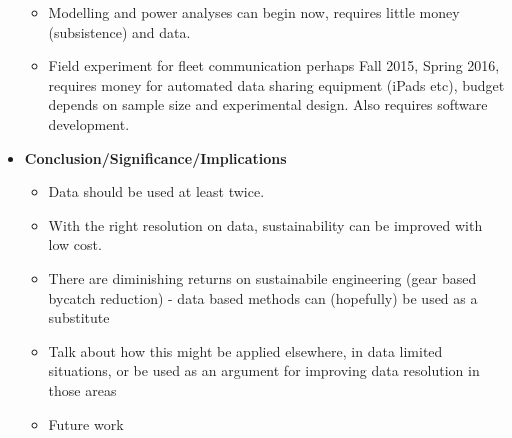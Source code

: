 \documentclass{article}
\begin{document}
\begin{itemize}
    \begin{itemize}
      \item Modelling and power analyses can begin now, requires little money (subsistence) and data.
      \item Field experiment for fleet communication perhaps Fall 2015, Spring 2016, requires money for automated data sharing equipment (iPads etc), budget depends on sample size and experimental design. Also requires software development.
    \end{itemize}
  \item {\bf Conclusion/Significance/Implications}
    \begin{itemize}
      \item Data should be used at least twice.
      \item With the right resolution on data, sustainability can be improved with low cost.
      \item There are diminishing returns on sustainabile engineering (gear based bycatch reduction) - data based methods can (hopefully) be used as a substitute
      \item Talk about how this might be applied elsewhere, in data limited situations, or be used as an argument for improving data resolution in those areas
      \item Future work
    \end{itemize}
\end{itemize}




     

      
\end{document}
